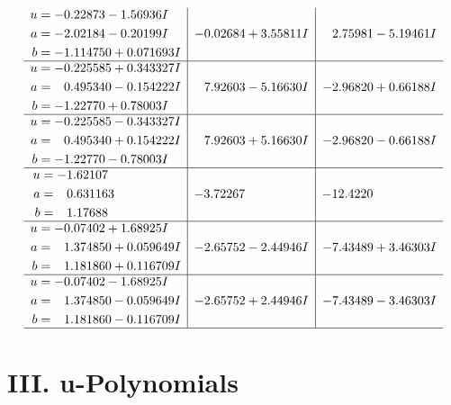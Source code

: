 \documentclass[1p]{elsarticle_modified}
\theoremstyle{definition}
\begin{document}
$$\begin{array}{c|c|c}
\begin{aligned}
u &= -0.22873 - 1.56936 I \\
a &= -2.02184 - 0.20199 I \\
b &= -1.114750 + 0.071693 I\end{aligned}
 & -0.02684 + 3.55811 I & \phantom{-}2.75981 - 5.19461 I \\ \hline\begin{aligned}
u &= -0.225585 + 0.343327 I \\
a &= \phantom{-}0.495340 - 0.154222 I \\
b &= -1.22770 + 0.78003 I\end{aligned}
 & \phantom{-}7.92603 - 5.16630 I & -2.96820 + 0.66188 I \\ \hline\begin{aligned}
u &= -0.225585 - 0.343327 I \\
a &= \phantom{-}0.495340 + 0.154222 I \\
b &= -1.22770 - 0.78003 I\end{aligned}
 & \phantom{-}7.92603 + 5.16630 I & -2.96820 - 0.66188 I \\ \hline\begin{aligned}
u &= -1.62107\phantom{ +0.000000I} \\
a &= \phantom{-}0.631163\phantom{ +0.000000I} \\
b &= \phantom{-}1.17688\phantom{ +0.000000I}\end{aligned}
 & -3.72267\phantom{ +0.000000I} & -12.4220\phantom{ +0.000000I} \\ \hline\begin{aligned}
u &= -0.07402 + 1.68925 I \\
a &= \phantom{-}1.374850 + 0.059649 I \\
b &= \phantom{-}1.181860 + 0.116709 I\end{aligned}
 & -2.65752 - 2.44946 I & -7.43489 + 3.46303 I \\ \hline\begin{aligned}
u &= -0.07402 - 1.68925 I \\
a &= \phantom{-}1.374850 - 0.059649 I \\
b &= \phantom{-}1.181860 - 0.116709 I\end{aligned}
 & -2.65752 + 2.44946 I & -7.43489 - 3.46303 I\\
 \hline 
 \end{array}$$\newpage
\newpage\renewcommand{\arraystretch}{1}
\centering \section*{ III. u-Polynomials}
\end{document}

